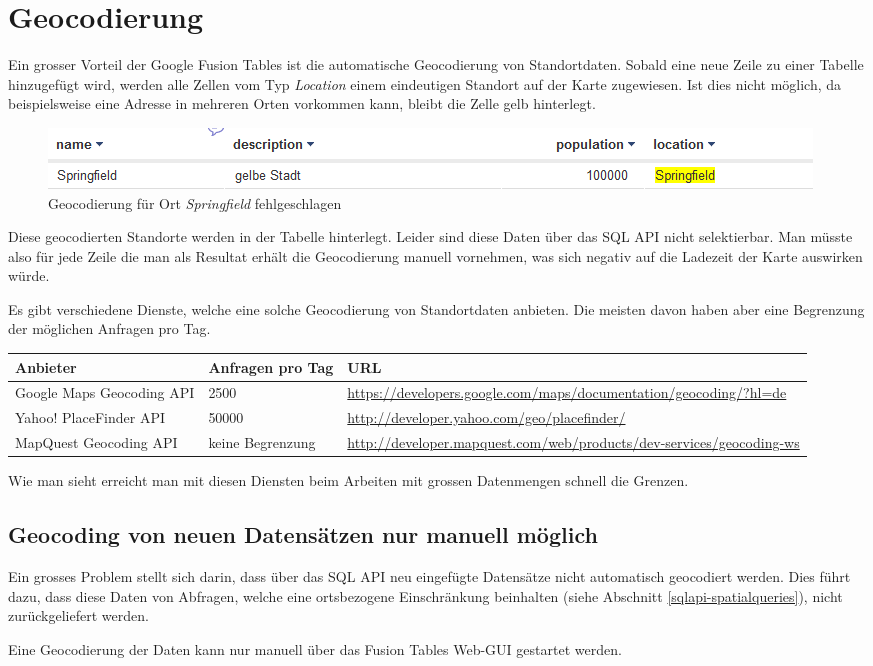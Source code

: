 \section{Geocodierung}
\label{geocodierung}
Ein grosser Vorteil der Google Fusion Tables ist die automatische 
\gls{Geocodierung} von Standortdaten. Sobald eine neue Zeile zu einer Tabelle hinzugefügt wird, werden alle Zellen vom Typ \emph{Location} einem eindeutigen Standort auf der Karte zugewiesen. Ist dies nicht möglich, da beispielsweise eine Adresse in mehreren Orten vorkommen kann, bleibt die Zelle gelb hinterlegt.

 \begin{figure}[!h]
	\centering
	\includegraphics[scale=0.75]{images/geocoding_failed.png}
	\caption{Geocodierung für Ort \emph{Springfield} fehlgeschlagen}
	\label{geocoding_failed}
\end{figure}

Diese geocodierten Standorte werden in der Tabelle hinterlegt. Leider sind diese Daten über das SQL API nicht selektierbar. Man müsste also für jede Zeile die man als Resultat erhält die Geocodierung manuell vornehmen, was sich negativ auf die Ladezeit der Karte auswirken würde.

Es gibt verschiedene Dienste, welche eine solche Geocodierung von Standortdaten anbieten. Die meisten davon haben aber eine Begrenzung der möglichen Anfragen pro Tag.

\begin{longtable}{|l|p{1.9cm}|p{7.3cm}|}
\hline 
\textbf{Anbieter} & \textbf{Anfragen pro Tag} & \textbf{URL} \\ 
\hline 
Google Maps Geocoding API & 2500 & \url{https://developers.google.com/maps/documentation/geocoding/?hl=de} \\ 
\hline 
Yahoo! PlaceFinder API & 50000 & \url{http://developer.yahoo.com/geo/placefinder/} \\ 
\hline 
MapQuest Geocoding API & keine Begrenzung & \url{http://developer.mapquest.com/web/products/dev-services/geocoding-ws} \\ 
\hline 
\end{longtable} 

Wie man sieht erreicht man mit diesen Diensten beim Arbeiten mit grossen Datenmengen schnell die Grenzen.

\subsection{Geocoding von neuen Datensätzen nur manuell möglich}
\label{geocodierung-bug}
Ein grosses Problem stellt sich darin, dass über das SQL API neu eingefügte Datensätze nicht automatisch geocodiert werden. Dies führt dazu, dass diese Daten von Abfragen, welche eine ortsbezogene Einschränkung beinhalten (siehe Abschnitt \ref{sqlapi-spatialqueries}), nicht zurückgeliefert werden.

Eine Geocodierung der Daten kann nur manuell über das Fusion Tables Web-GUI gestartet werden.